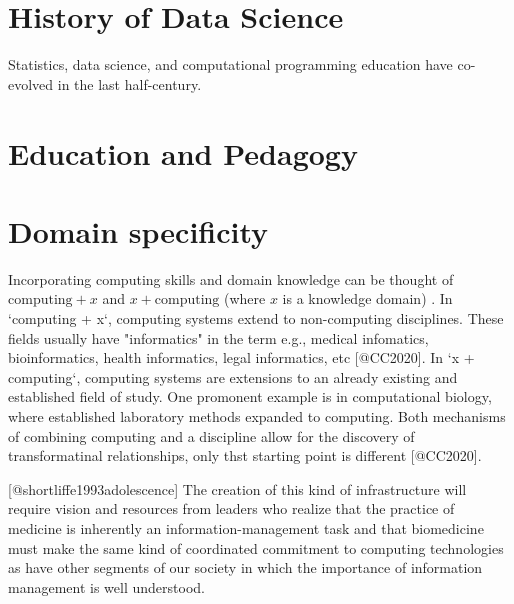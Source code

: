 \documentclass[../main.tex]{subfiles}
\begin{document}
    

    \section{History of Data Science}
        \label{se:intro-ds-history}

        Statistics, data science, and computational programming education
        have co-evolved in the last half-century.

        
        
        
        
        

    \section{Education and Pedagogy}

        
        
        

    \section{Domain specificity}

        Incorporating computing skills and domain knowledge can be thought of
        $\text{computing} + x$ and $x + \text{computing}$ (where $x$ is a knowledge domain)
        \cite{cc2020}.
        In `computing + x`, computing systems extend to non-computing disciplines.
        These fields usually have "informatics" in the term
        e.g., medical infomatics, bioinformatics, health informatics, legal informatics, etc [@CC2020].
        In `x + computing`,
        computing systems are extensions to an already existing and established field of study.
        One promonent example is in computational biology,
        where established laboratory methods expanded to computing.
        Both mechanisms of combining computing and a discipline allow for the discovery of transformatinal relationships,
        only thst starting point is different [@CC2020].


        [@shortliffe1993adolescence]
        The creation of this kind of infrastructure will require vision and resources from leaders who realize that the practice of medicine is inherently an information-management task and that biomedicine must make the same kind of coordinated commitment to computing technologies as have other segments of our society in which the importance of information management is well understood.
\end{document}
